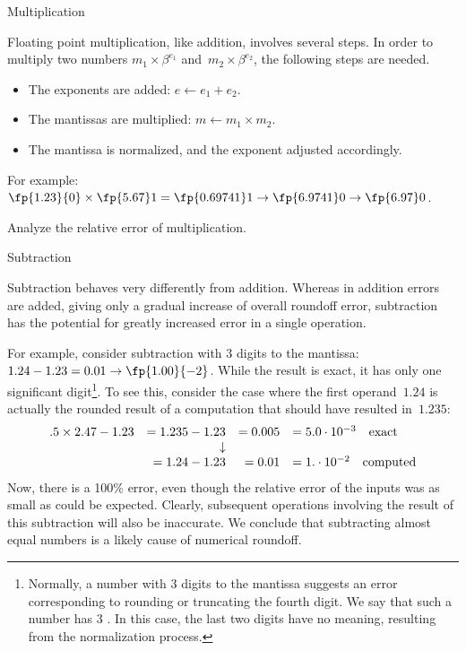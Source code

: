  {Multiplication}

Floating point multiplication, like addition, involves several steps.
In order to multiply two numbers $m_1\times\beta^{e_1}$
and~$m_2\times\beta^{e_2}$, the following steps are needed.
\begin{itemize}
\item The exponents are added: $e\leftarrow e_1+e_2$.
\item The mantissas are multiplied: $m\leftarrow
  m_1\times m_2$.
\item The mantissa is normalized, and the exponent adjusted accordingly.
\end{itemize}

For example: $\fp{1.23}{0}\times\fp{5.67}1=\fp{0.69741}1\rightarrow
\fp{6.9741}0\rightarrow\fp{6.97}0$.

\begin{exercise}
  Analyze the relative error of multiplication.
\end{exercise}

 {Subtraction}
\label{sec:subtraction}

Subtraction behaves very differently from addition. Whereas in
addition errors are added, giving only a gradual increase of overall
roundoff error, subtraction has the potential for greatly increased
error in a single operation. 

For example, consider subtraction with 3 digits to the mantissa:
$1.24-1.23=0.01\rightarrow \fp{1.00}{-2}$. While the result is exact,
it has only one significant digit\footnote
{Normally, a number with 3
  digits to the mantissa suggests an error corresponding to rounding
  or truncating the fourth digit. We say that such a number has 3
  . In this case, the last two digits have no
  meaning, resulting from the normalization process.}.
To see this, consider
the case where the first operand~$1.24$ is actually the rounded result
of a computation that should have resulted in~$1.235$:
\begin{equation}
\begin{array}{rrrl}
  .5\times 2.47-1.23 &=1.235-1.23 &=0.005 &=5.0\cdot 10^{-3}\quad\hbox{exact}\\
                     &\downarrow\\
                     &=1.24-1.23  &=0.01  &=1.\cdot 10^{-2}\quad\hbox{computed}\\
\end{array}
\end{equation}
Now, there is a 100\% error, even though the relative error of the
inputs was as small as could be expected. Clearly, subsequent
operations involving the result of this subtraction will also be
inaccurate.
We conclude that subtracting almost equal numbers is a likely cause of
  numerical roundoff.

